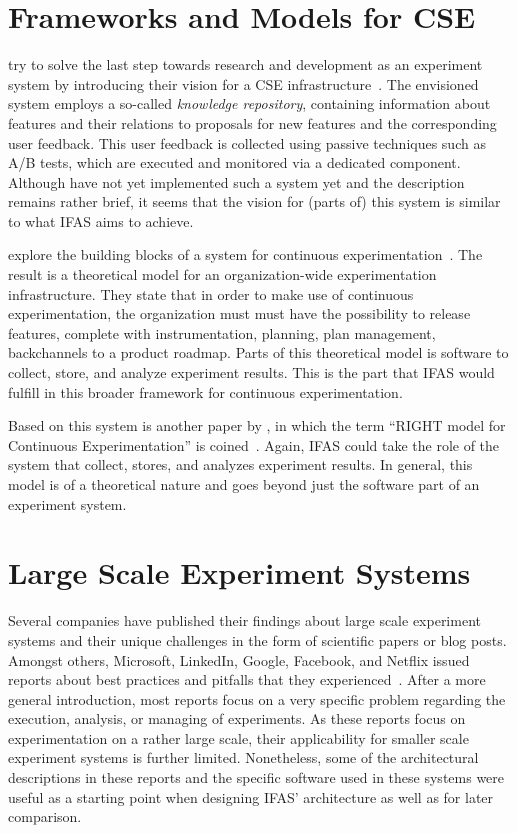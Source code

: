 \section{Frameworks and Models for \ac{CSE}}
\label{sec:related:frameworks}

\citeauthor{Johanssen2017} try to solve the last step towards research and development as an experiment system by introducing their vision for a \ac{CSE} infrastructure~\cite{Johanssen2017}.
The envisioned system employs a so-called \emph{knowledge repository}, containing information about features and their relations to proposals for new features and the corresponding user feedback.
This user feedback is collected using passive techniques such as A/B tests, which are executed and monitored via a dedicated component.
Although \citeauthor{Johanssen2017} have not yet implemented such a system yet and the description remains rather brief, it seems that the vision for (parts of) this system is similar to what \ac{IFAS} aims to achieve.

\citeauthor{Fagerholm2014} explore the building blocks of a system for continuous experimentation~\cite{Fagerholm2014}.
The result is a theoretical model for an organization-wide experimentation infrastructure.
They state that in order to make use of continuous experimentation, the organization must must have the possibility to release features, complete with instrumentation, planning, plan management, backchannels to a product roadmap.
Parts of this theoretical model is software to collect, store, and analyze experiment results.
This is the part that \ac{IFAS} would fulfill in this broader framework for continuous experimentation.

Based on this system is another paper by \citeauthor{Fagerholm2017}, in which the term ``RIGHT model for Continuous Experimentation'' is coined~\cite{Fagerholm2017}.
Again, \ac{IFAS} could take the role of the system that collect, stores, and analyzes experiment results.
In general, this model is of a theoretical nature and goes beyond just the software part of an experiment system.

\section{Large Scale Experiment Systems}
\label{sec:related:large}

Several companies have published their findings about large scale experiment systems and their unique challenges in the form of scientific papers or blog posts.
Amongst others, Microsoft, LinkedIn, Google, Facebook, and Netflix issued reports about best practices and pitfalls that they experienced~\cite{Kohavi2013,Xu2015,Tang2010,Bakshy2014,WEB:Netflix:2016}.
After a more general introduction, most reports focus on a very specific problem regarding the execution, analysis, or managing of experiments.
As these reports focus on experimentation on a rather large scale, their applicability for smaller scale experiment systems is further limited.
Nonetheless, some of the architectural descriptions in these reports and the specific software used in these systems were useful as a starting point when designing \ac{IFAS}' architecture as well as for later comparison.



